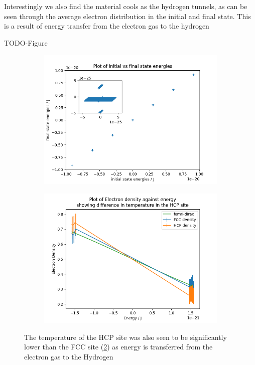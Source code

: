 Interestingly we also find the material cools
as the hydrogen tunnels, as can be seen
through the average electron distribution in
the initial and final state. This is a
result of energy transfer from the
electron gas to the hydrogen

TODO-Figure
\begin{figure}[htbp]
    \centering
    \begin{subfigure}{0.45\linewidth}
        \includegraphics[width=0.9\linewidth]{Figures/Simulation/two band eigenstate energies varience.png}
    \end{subfigure}
    \hfill
    \begin{subfigure}{0.45\linewidth}
        \includegraphics[width=0.9\linewidth]{Figures/Simulation/two band electron distribution.png}
        \label{fig:two band temperature shift}
    \end{subfigure}
    \caption{
        The temperature of the HCP site was also
        seen to be significantly lower than the FCC
        site (\cref{fig:two band temperature shift})
        as energy is transferred from the electron gas
        to the Hydrogen
    }
\end{figure}

